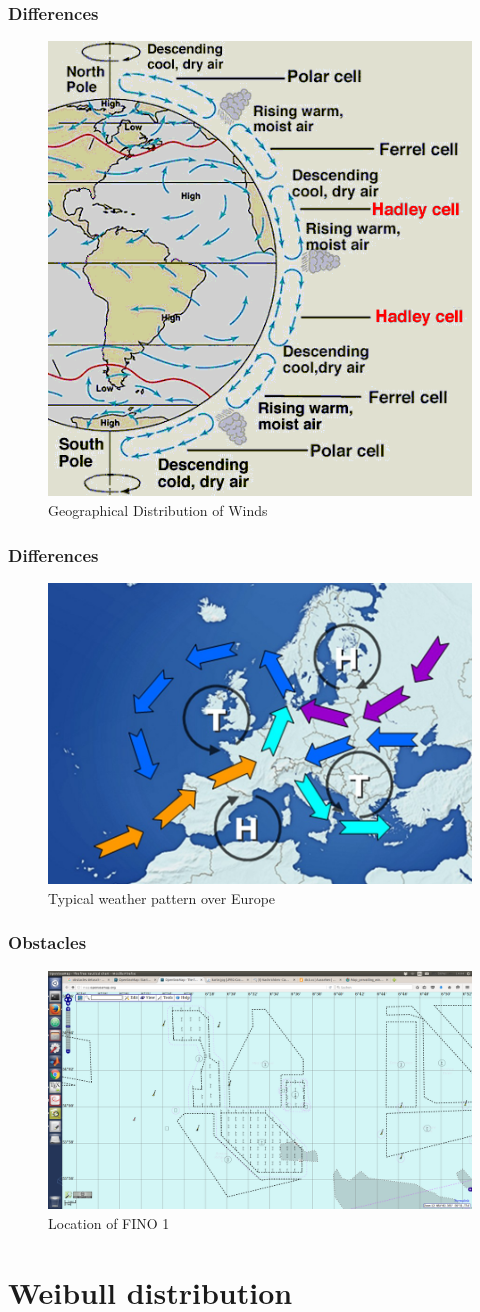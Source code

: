 \documentclass[12pt,t]{beamer}
\begin{document}
\begin{frame}
\frametitle{Differences}
\begin{figure}[H]
\centering
\includegraphics[width=0.5\linewidth]{../../figures/Ferrel_cell.png}
\caption{Geographical Distribution of Winds}
\label{fig:weatherpattern}
\end{figure}
\end{frame}


\begin{frame}
\frametitle{Differences}
\begin{figure}[H]
\centering
\includegraphics[width=0.7\linewidth]{../../figures/warm_air_advection.png}
\caption{Typical weather pattern over Europe}
\label{fig:weatherpattern}
\end{figure}
\end{frame}


\begin{frame}
\frametitle{Obstacles}
\begin{figure}[H]
\centering
\includegraphics[width=0.8\linewidth]{../../figures/fino1.png}
\caption{Location of FINO 1}
\label{fig:fino1}
\end{figure} 
\end{frame}
\section{Weibull distribution}




\end{document}
